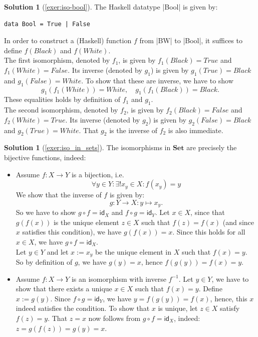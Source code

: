 \documentclass[a4paper,11pt, oneside,titlepage=false]{scrbook}
\theoremstyle{plain}
\theoremstyle{definition}
\newtheorem{solution}[thm]{Solution}
\newcommand{\cfont}[1]{\ensuremath{\mathsf{#1}}}
\newcommand{\Catb}[1]{\mathbf{#1}}
\newcommand{\SET}{\Catb{Set}}
\newcommand{\Id}[1][]{\cfont{id}_{#1}}
\newcommand{\co}[2]{\ensuremath{#2 \circ #1}}
\begin{document}
\begin{solution}[\cref{exer:iso-bool}]\label{sol:iso-bool}
The Haskell datatype |Bool| is given by:
\begin{lstlisting}
data Bool = True | False
\end{lstlisting}
In order to construct a (Haskell) function $f$ from |BW| to |Bool|, it suffices to define $f(Black)$ and $f(White)$.\\
The first isomorphism, denoted by $f_1$, is given by $f_1(Black)=True$ and $f_1(White) = False$. Its inverse (denoted by $g_1$) is given by $g_1(True) = Black$ and $g_1(False) = White$. To show that these are inverse, we have to show
\[
g_1 (f_1 (White)) = White, \quad g_1 (f_1 (Black)) = Black.
\]
These equalities holds by definition of $f_1$ and $g_1$.\\
The second isomorphism, denoted by $f_2$, is given by $f_2(Black)=False$ and $f_2(White) = True$. Its inverse (denoted by $g_2$) is given by $g_2(False) = Black$ and $g_2(True) = White$. That $g_2$ is the inverse of $f_2$ is also immediate.
\end{solution}

\begin{solution}[\cref{exer:iso_in_sets}]\label{sol:iso_in_sets}
The isomorphisms in $\SET$ are precisely the bijective functions, indeed:
\begin{itemize}
\item Assume $f: X\to Y$ is a bijection, i.e.
\[
\forall y\in Y: \exists! x_{y}\in X: f(x_y)=y
\]
We show that the inverse of $f$ is given by:
\[
g : Y\to X: y\mapsto x_y.
\]
So we have to show $\co{f}{g} = \Id[X]$ and $\co{g}{f} = \Id[Y]$. Let $x\in X$, since that $g(f(x))$ is the unique element $z\in X$ such that $f(z) = f(x)$ (and since $x$ satisfies this condition), we have $g(f(x)) = x$. Since this holds for all $x\in X$, we have $\co{f}{g} = \Id[X]$.\\
Let $y\in Y$ and let $x := x_y$  be the unique element in $X$ such that $f(x)=y$. So by definition of $g$, we have $g(y) = x$, hence
$f(g(y)) = f(x) = y$.
\item Assume $f:X\to Y$ is an isomorphism with inverse $f^{-1}$. Let $y\in Y$, we have to show that there exists a unique $x\in X$ such that $f(x)=y$. Define $x := g(y)$. Since $\co{g}{f} = \Id[Y]$, we have $y = f(g(y)) = f(x)$, hence, this $x$ indeed satisfies the condition. To show that $x$ is unique, let $z\in X$ satisfy $f(z)=y$. That $z=x$ now follows from $\co{f}{g} = \Id[X]$, indeed:
$z = g(f(z)) = g(y) = x$.
\end{itemize}
\end{solution}
\end{document}
